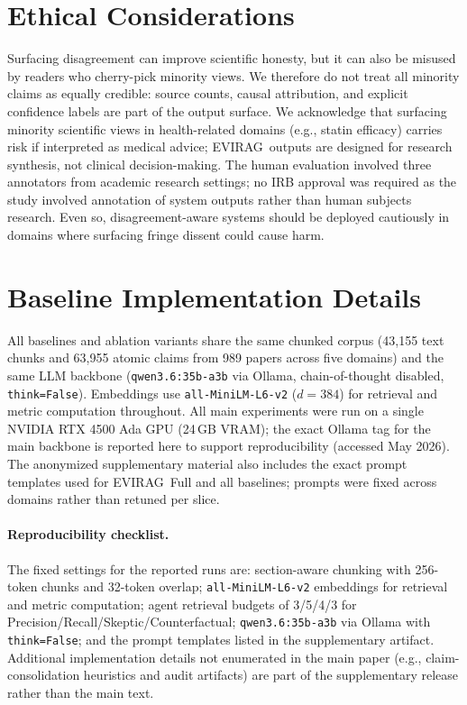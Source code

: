 \documentclass[11pt]{article}
\newcommand{\system}{\textsc{EVIRAG}\xspace}
\begin{document}
\section{Ethical Considerations}
\label{sec:ethics}

Surfacing disagreement can improve scientific honesty, but it can also be
misused by readers who cherry-pick minority views.  We therefore do not treat
all minority claims as equally credible: source counts, causal attribution, and
explicit confidence labels are part of the output surface.  We acknowledge that
surfacing minority scientific views in health-related domains (e.g., statin
efficacy) carries risk if interpreted as medical advice; \system\ outputs are
designed for research synthesis, not clinical decision-making.
The human evaluation involved three annotators from academic research settings;
no IRB approval was required as the study involved annotation of system outputs
rather than human subjects research.
Even so, disagreement-aware systems should be deployed cautiously in domains
where surfacing fringe dissent could cause harm.



\clearpage
\appendix

\section{Baseline Implementation Details}
\label{app:baselines}

All baselines and ablation variants share the same chunked corpus
(43,155 text chunks and 63,955 atomic claims from 989 papers across five domains)
and the same LLM backbone (\texttt{qwen3.6:35b-a3b} via Ollama, chain-of-thought
disabled, \texttt{think=False}).  Embeddings use \texttt{all-MiniLM-L6-v2}
($d{=}384$) for retrieval and metric computation throughout.
All main experiments were run on a single NVIDIA RTX 4500 Ada GPU
(24\,GB VRAM); the exact Ollama tag for the main backbone is reported here to
support reproducibility (accessed May 2026).  The anonymized supplementary
material also includes the exact prompt templates used for \system\ Full and
all baselines; prompts were fixed across domains rather than retuned per slice.

\paragraph{Reproducibility checklist.}
The fixed settings for the reported runs are: section-aware chunking with
256-token chunks and 32-token overlap; \texttt{all-MiniLM-L6-v2} embeddings for
retrieval and metric computation; agent retrieval budgets of 3/5/4/3 for
Precision/Recall/Skeptic/Counterfactual; \texttt{qwen3.6:35b-a3b} via Ollama
with \texttt{think=False}; and the prompt templates listed in the supplementary
artifact.  Additional implementation details not enumerated in the main paper
(e.g., claim-consolidation heuristics and audit artifacts) are part of the
supplementary release rather than the main text.
\end{document}
